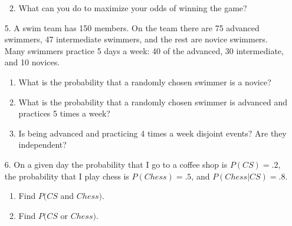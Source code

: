\documentclass[oneside]{amsart}
\theoremstyle{definition}
\theoremstyle{definition}
\begin{document}
\begin{enumerate}
\begin{enumerate}
            \vfill 

            \item What can you do to maximize your odds of winning the game?

            \vfill 
        \end{enumerate}
        

\newpage

                 \item[5.] A swim team has 150 members. On the team there are 75 advanced swimmers, 47 intermediate swimmers, and the rest are novice swimmers. Many swimmers practice 5 days a week: 40 of the advanced, 30 intermediate, and 10 novices.

             \begin{enumerate}
                 \item What is the probability that a randomly chosen swimmer is a novice?
                 \vfill
                 \item What is the probability that a randomly chosen swimmer is advanced and practices 5 times a week?
                 \vfill
                 \item Is being advanced and practicing 4 times a week disjoint events? Are they independent?
                 \vfill
             \end{enumerate}

                              \item[6.] On a given day the probability that I go to a coffee shop is $P(CS)=.2$, the probability that I play chess is $P(Chess)=.5$, and $P(Chess|CS)=.8$.

             \begin{enumerate}
                 \item Find $P(CS$ and $Chess)$.
                 \vfill
                 \item Find $P(CS$ or $Chess)$.
                 \vfill
             \end{enumerate}
        
    

    
\end{enumerate}
\end{document}
